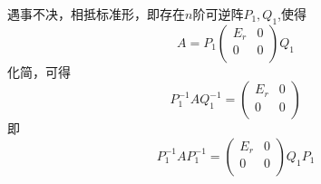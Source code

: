 \documentclass[lang=cn,10pt]{elegantbook}
\begin{document}
	遇事不决，相抵标准形，即存在$n$阶可逆阵$P_{1},Q_{1}$,使得
	\begin{equation*}
		A=P_{1}\left( \begin{matrix}
			E_r&		0\\
			0&		0\\
		\end{matrix} \right)Q_{1}
	\end{equation*}
	化简，可得
	\begin{equation*}
		P_{1}^{-1}AQ_{1}^{-1}=\left( \begin{matrix}
			E_r&		0\\
			0&		0\\
		\end{matrix} \right)
	\end{equation*}
	即
	\begin{equation*}
		P_{1}^{-1}AP_{1}^{-1}=\left( \begin{matrix}
			E_r&		0\\
			0&		0\\
		\end{matrix} \right)Q_{1}P_{1}
	\end{equation*}
\end{document}
